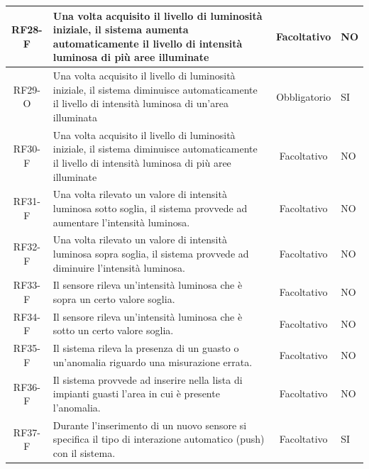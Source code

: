 \documentclass[a4paper, 11pt]{article}
\begin{document}
\begin{longtable}{|c|p{7cm}|c|p{4cm}|}
    \hline
    RF28-F          & Una volta acquisito il livello di luminosità iniziale, il sistema aumenta automaticamente il livello di intensità luminosa di più aree illuminate             & Facoltativo        & NO                   \\
    \hline
    RF29-O          & Una volta acquisito il livello di luminosità iniziale, il sistema diminuisce automaticamente il livello di intensità luminosa di un'area illuminata           & Obbligatorio       & SI                   \\
    \hline
    RF30-F          & Una volta acquisito il livello di luminosità iniziale, il sistema diminuisce automaticamente il livello di intensità luminosa di più aree illuminate          & Facoltativo        & NO                   \\
    \hline
    RF31-F          & Una volta rilevato un valore di intensità luminosa sotto soglia, il sistema provvede ad aumentare l'intensità luminosa.                                       & Facoltativo        & NO                   \\
    \hline
    RF32-F          & Una volta rilevato un valore di intensità luminosa sopra soglia, il sistema provvede ad diminuire l'intensità luminosa.                                       & Facoltativo        & NO                   \\
    \hline
    RF33-F          & Il sensore rileva un'intensità luminosa che è sopra un certo valore soglia.                                                                                   & Facoltativo        & NO                   \\
    \hline
    RF34-F          & Il sensore rileva un'intensità luminosa che è sotto un certo valore soglia.                                                                                   & Facoltativo        & NO                   \\
    \hline
    RF35-F          & Il sistema rileva la presenza di un guasto o un'anomalia riguardo una misurazione errata.                                                                     & Facoltativo        & NO                   \\
    \hline
    RF36-F          & Il sistema provvede ad inserire nella lista di impianti guasti l'area in cui è presente l'anomalia.                                                           & Facoltativo        & NO                   \\
    \hline
    RF37-F          & Durante l'inserimento di un nuovo sensore si specifica il tipo di interazione automatico (push) con il sistema.                                               & Facoltativo        & SI                   \\

\end{longtable}
\end{document}
